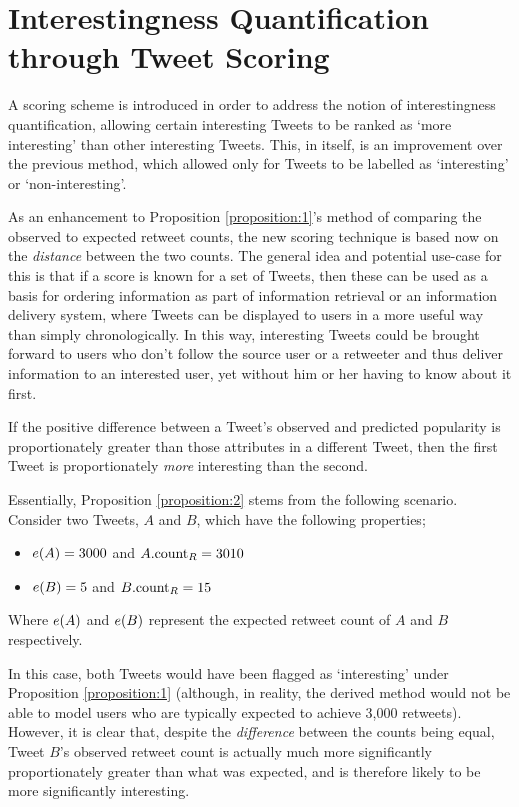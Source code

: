 \section{Interestingness Quantification through Tweet Scoring}
A scoring scheme is introduced in order to address the notion of interestingness quantification, allowing certain interesting Tweets to be ranked as `more interesting' than other interesting Tweets. This, in itself, is an improvement over the previous method, which allowed only for Tweets to be labelled as `interesting' or `non-interesting'.

As an enhancement to Proposition \ref{proposition:1}'s method of comparing the observed to expected retweet counts, the new scoring technique is based now on the \textit{distance} between the two counts. The general idea and potential use-case for this is that if a score is known for a set of Tweets, then these can be used as a basis for ordering information as part of information retrieval or an information delivery system, where Tweets can be displayed to users in a more useful way than simply chronologically. In this way, interesting Tweets could be brought forward to users who don't follow the source user or a retweeter and thus deliver information to an interested user, yet without him or her having to know about it first.

\begin{myproposition}
\label{proposition:2}
If the positive difference between a Tweet's observed and predicted popularity is proportionately greater than those attributes in a different Tweet, then the first Tweet is proportionately \textit{more} interesting than the second.
\end{myproposition}

Essentially, Proposition \ref{proposition:2} stems from the following scenario. Consider two Tweets, $A$ and $B$, which have the following properties;
\begin{itemize}
    \item $e(A) = 3000$ and $A.\textrm{count}_R = 3010$
    \item $e(B) = 5$ and $B.\textrm{count}_R = 15$
\end{itemize}
Where $e(A)$ and $e(B)$ represent the expected retweet count of $A$ and $B$ respectively.

In this case, both Tweets would have been flagged as `interesting' under Proposition \ref{proposition:1} (although, in reality, the derived method would not be able to model users who are typically expected to achieve 3,000 retweets). However, it is clear that, despite the \textit{difference} between the counts being equal, Tweet $B$'s observed retweet count is actually much more significantly proportionately greater than what was expected, and is therefore likely to be more significantly interesting.


